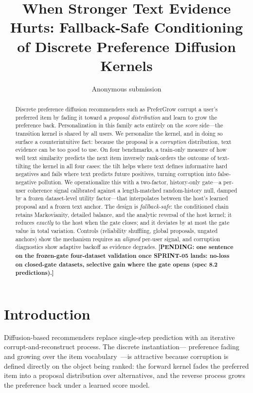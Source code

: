 \documentclass[letterpaper]{article}
\title{When Stronger Text Evidence Hurts: Fallback-Safe Conditioning of
Discrete Preference Diffusion Kernels}
\author{Anonymous submission}
\newcommand{\pending}[1]{{\color{red}\textbf{[PENDING: #1]}}}
\begin{document}
\maketitle

\begin{abstract}
Discrete preference diffusion recommenders such as PreferGrow corrupt a
user's preferred item by fading it toward a \emph{proposal distribution}
and learn to grow the preference back. Personalization in this family
acts entirely on the \emph{score} side---the transition kernel is shared
by all users. We personalize the kernel, and in doing so surface a
counterintuitive fact: because the proposal is a \emph{corruption}
distribution, text evidence can be too good to use. On four benchmarks,
a train-only measure of how well text similarity predicts the next item
inversely rank-orders the outcome of text-tilting the kernel in all four
cases: the tilt helps where text defines informative hard negatives and
fails where text predicts future positives, turning corruption into
false-negative pollution. We operationalize this with a two-factor,
history-only gate---a per-user coherence signal calibrated against a
length-matched random-history null, damped by a frozen dataset-level
utility factor---that interpolates between the host's learned proposal
and a frozen text anchor. The design is \emph{fallback-safe}: the
conditioned chain retains Markovianity, detailed balance, and the
analytic reversal of the host kernel; it reduces \emph{exactly} to the
host when the gate closes; and it deviates by at most the gate value in
total variation. Controls (reliability shuffling, global proposals,
ungated anchors) show the mechanism requires an \emph{aligned} per-user
signal, and corruption diagnostics show adaptive backoff as evidence
degrades. \pending{one sentence on the frozen-gate four-dataset
validation once SPRINT-05 lands: no-loss on closed-gate datasets,
selective gain where the gate opens (spec 8.2 predictions).}
\end{abstract}

\section{Introduction}

Diffusion-based recommenders replace single-step prediction with an
iterative corrupt-and-reconstruct process. The discrete instantiation---%
preference fading and growing over the item
vocabulary~\cite{prefergrow}---is attractive because corruption is
defined directly on the object being ranked: the forward kernel fades
the preferred item into a proposal distribution over alternatives, and
the reverse process grows the preference back under a learned score
model.
\end{document}
